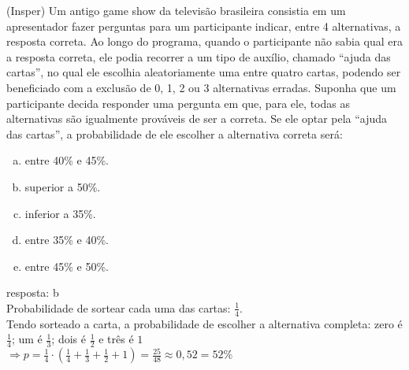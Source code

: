 \begin{ex}
(Insper) Um antigo game show da televisão brasileira consistia em um apresentador fazer perguntas para um participante indicar, entre 4 alternativas, a resposta correta. Ao longo do programa, quando o participante não sabia qual era a resposta correta, ele podia recorrer a um tipo de auxílio, chamado “ajuda das cartas”, no qual ele escolhia aleatoriamente uma entre quatro cartas, podendo ser beneficiado com a exclusão de 0, 1, 2 ou 3 alternativas erradas. Suponha que um participante decida responder uma pergunta em que, para ele, todas as alternativas são igualmente prováveis de ser a correta. Se ele optar pela “ajuda das cartas”, a probabilidade de ele escolher a alternativa correta será:
 \begin{enumerate} [(a)]
     \item entre 40\% e 45\%.
     \item superior a 50\%.
     \item inferior a 35\%.
     \item entre 35\% e 40\%.
     \item entre 45\% e 50\%.
 \end{enumerate}
   \begin{sol}
   resposta: b \\
   Probabilidade de sortear cada uma das cartas: $\frac{1}{4}$.  \\
   Tendo sorteado a carta, a probabilidade de escolher a alternativa completa: zero é $\frac{1}{4}$; um é $\frac{1}{3}$; dois é $\frac{1}{2}$ e três é $1$ \\
   $\Longrightarrow p=\frac{1}{4}\cdot(\frac{1}{4}+\frac{1}{3}+\frac{1}{2}+1)=\frac{25}{48}\approx 0,52=52\%$
   \end{sol}
\end{ex}